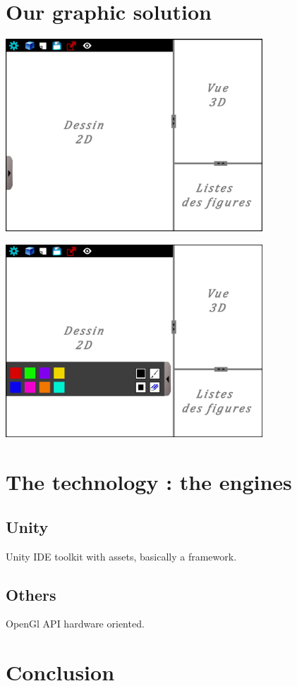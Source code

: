 \documentclass[a4paper,10pt]{beamer}
\begin{document}
	\section{Our graphic solution}
		
		\begin{frame}{}
			\includegraphics[height=205pt]{AppliMenuFerme.png}
		\end{frame}
		
		\begin{frame}
			\includegraphics[height=205pt]{AppliMenuOuvert.png}
		\end{frame}
	
	\section{The technology : the engines}
	
		\subsection{Unity}
		
			\begin{frame}{Unity}
				IDE toolkit with assets, basically a framework.
			\end{frame}
			
		\subsection{Others}
			
			\begin{frame}{OpenGl}
				API hardware oriented.
			\end{frame}
			
	\section{Conclusion}
	
\end{document}
